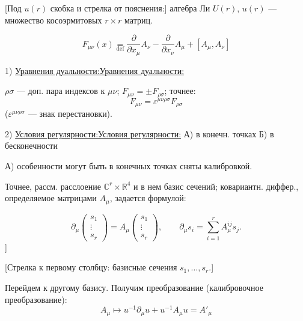 \documentclass[11pt]{article}
\theoremstyle{definition}
\theoremstyle{remark}
\newcommand{\Unclear}[3]{%
  \begingroup\color{orange!70!black}%
  [Unresolved reading #1/#2: #3]\endgroup%
}
\renewcommand{\Unclear}[3]{%
  \begingroup\color{orange!65!black}%
  \ifmmode\text{[неясно: #3]}\else[неясно: #3]\fi\endgroup%
}
\let\DiplomaticMathUnderline\underline
\renewcommand{\underline}[1]{\ifmmode\DiplomaticMathUnderline{#1}\else\uline{#1}\fi}
\begin{document}
[Под $u(r)$ скобка и стрелка от пояснения:]
алгебра Ли $U(r)$, $u(r)$ --- множество косоэрмитовых $r\times r$ матриц.

\begin{equation*}
F_{\mu\nu}(x)\underset{\mathrm{def}}{=}
\frac{\partial}{\partial x_\mu}A_\nu
-\frac{\partial}{\partial x_\nu}A_\mu
+[A_\mu,A_\nu]
\tag{1}
\end{equation*}

1) \underline{Уравнения дуальности:}

$\rho\sigma$ --- доп. пара индексов к $\mu\nu$;
$F_{\mu\nu}=\pm F_{\rho\sigma}$; точнее:
\begin{equation*}
F_{\mu\nu}=\varepsilon^{\mu\nu\rho\sigma}F_{\rho\sigma}
\tag{2}
\end{equation*}
($\varepsilon^{\mu\nu\rho\sigma}$ --- знак перестановки).

2) \underline{Условия регулярности:} А) в конечн. точках Б) в бесконечности

А) особенности могут быть в конечных точках сняты калибровкой.

Точнее, рассм. расслоение $\mathbb{C}^{r}\times\mathbb{R}^{4}$ и в нем базис сечений;
ковариантн. диффер., определяемое матрицами $A_\mu$, задается формулой:

\begin{equation*}
\partial_\mu
\begin{pmatrix}s_1\\ \vdots\\ s_r\end{pmatrix}
=A_\mu\begin{pmatrix}s_1\\ \vdots\\ s_r\end{pmatrix},
\qquad
\partial_\mu s_i=\sum_{i=1}^{r}A_\mu^{ij}s_j.
\tag{3}
\end{equation*}
\Unclear{GELFAND-P000738}{eq-03-summation}{[В нижнем пределе суммы написано $i=1$; индекс у $s_i$ обведен.]}
[Стрелка к первому столбцу: базисные сечения $s_1,\ldots,s_r$.]

Перейдем к другому базису. Получим преобразование (калибровочное преобразование):
\begin{equation*}
A_\mu\mapsto u^{-1}\partial_\mu u+u^{-1}A_\mu u=A'_\mu
\tag{4}
\end{equation*}
\end{document}
